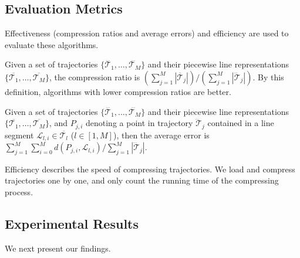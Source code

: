 \subsection{Evaluation Metrics}
Effectiveness (compression ratios and average errors) and efficiency are used to evaluate these algorithms.

Given a set of trajectories $\{\dddot{\mathcal{T}_1}, \ldots, \dddot{\mathcal{T}_M}\}$ and their piecewise line representations $\{\overline{\mathcal{T}_1}, \ldots, \overline{\mathcal{T}_M}\}$,
the compression ratio is $(\sum_{j=1}^{M} |\overline{\mathcal{T}}_j |)/(\sum_{j=1}^{M} |\dddot{\mathcal{T}}_j |)$.
By this definition, algorithms with lower compression ratios are better.

Given a set of trajectories $\{\dddot{\mathcal{T}_1}, \ldots, \dddot{\mathcal{T}_M}\}$ and their piecewise line representations
$\{\overline{\mathcal{T}_1}, \ldots, \overline{\mathcal{T}_M}\}$, and $P_{j,i}$ denoting
a point in trajectory $\dddot{\mathcal{T}}_j$ contained in a line segment $\mathcal{L}_{l,i}\in\overline{\mathcal{T}_l}$ ($l\in[1,M]$),
then the average error is $\sum_{j=1}^{M}\sum_{i=0}^{M} d(P_{j,i},
\mathcal{L}_{l,i})/\sum_{j=1}^{M}{|\dddot{\mathcal{T}}_j |}$.

Efficiency describes the speed of compressing trajectories. We load and compress trajectories one by one, and only count the running time of the compressing process.

\subsection{Experimental Results}
We next present our findings.

